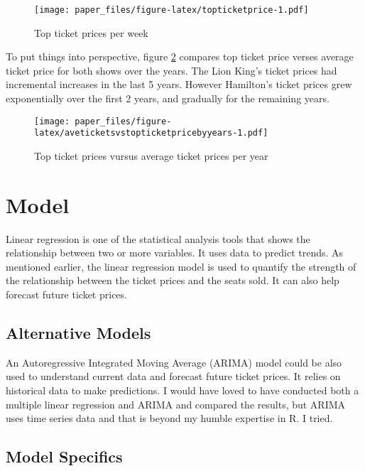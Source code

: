 \documentclass[
]{article}
\begin{document}
\begin{figure}
\centering
\texttt{[image: paper\_files/figure-latex/topticketprice-1.pdf]}
\caption{\label{fig:topticketprice}Top ticket prices per week}
\end{figure}

\newpage

To put things into perspective, figure \ref{fig:aveticketsvstopticketpricebyyears} compares top ticket price verses average ticket price for both shows over the years. The Lion King's ticket prices had incremental increases in the last 5 years. However Hamilton's ticket prices grew exponentially over the first 2 years, and gradually for the remaining years.

\begin{figure}
\centering
\texttt{[image: paper\_files/figure-latex/aveticketsvstopticketpricebyyears-1.pdf]}
\caption{\label{fig:aveticketsvstopticketpricebyyears}Top ticket prices vursus average ticket prices per year}
\end{figure}

\newpage

\hypertarget{model}{%
\section{Model}\label{model}}

Linear regression is one of the statistical analysis tools that shows the relationship between two or more variables. It uses data to predict trends. As mentioned earlier, the linear regression model is used to quantify the strength of the relationship between the ticket prices and the seats sold. It can also help forecast future ticket prices.

\hypertarget{alternative-models}{%
\subsection{Alternative Models}\label{alternative-models}}

An Autoregressive Integrated Moving Average (ARIMA) model could be also used to understand current data and forecast future ticket prices. It relies on historical data to make predictions. I would have loved to have conducted both a multiple linear regression and ARIMA and compared the results, but ARIMA uses time series data and that is beyond my humble expertise in R. I tried.

\hypertarget{model-specifics}{%
\subsection{Model Specifics}\label{model-specifics}}
\end{document}
